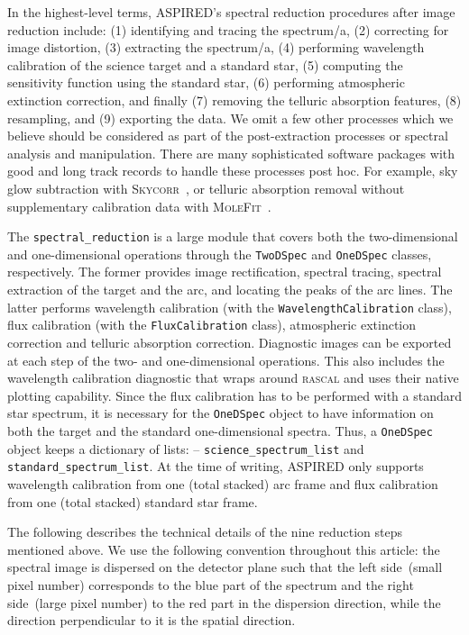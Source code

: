 \documentclass[linenumbers, twocolumn]{aastex631}
\begin{document}
In the highest-level terms, \textsc{ASPIRED}'s spectral reduction procedures
after image reduction include: (1) identifying and tracing the spectrum/a,
(2) correcting for image distortion, (3) extracting the spectrum/a,
(4) performing wavelength calibration of the science target and a standard
star, (5) computing the sensitivity function using the standard star,
(6) performing atmospheric extinction correction, and finally (7) removing
the telluric absorption features, (8) resampling, and (9) exporting the data.
We omit a few other processes which we believe should be considered as part of
the post-extraction processes or spectral analysis and manipulation. There are
many sophisticated  software packages with good and long track records to
handle these processes post hoc. For example, sky glow subtraction with
\textsc{Skycorr}~\citep{2014A&A...567A..25N}, or telluric
absorption removal without supplementary calibration data with
\textsc{MoleFit}~\citep{2015A&A...576A..77S, 2015A&A...576A..78K}.

The \texttt{spectral\_reduction} is a large module that covers both the
two-dimensional and one-dimensional operations through the \texttt{TwoDSpec} and
\texttt{OneDSpec} classes, respectively. The former provides image
rectification, spectral tracing, spectral extraction of the target and the
arc, and locating the peaks of the arc lines. The latter performs
wavelength calibration (with the \texttt{WavelengthCalibration} class),
flux calibration (with the \texttt{FluxCalibration} class), atmospheric
extinction correction and telluric absorption correction. Diagnostic images
can be exported at each step of the two- and one-dimensional operations.
This also includes the wavelength calibration diagnostic that wraps around
\textsc{rascal} and uses their native plotting capability.
Since the flux calibration has to be performed
with a standard star spectrum, it is necessary for the \texttt{OneDSpec}
object to have information on both the target and the standard one-dimensional
spectra. Thus, a \texttt{OneDSpec} object keeps a dictionary of lists: --
\texttt{science\_spectrum\_list} and \texttt{standard\_spectrum\_list}. At the
time of writing, \textsc{ASPIRED} only supports wavelength calibration from one (total
stacked) arc frame and flux calibration from one (total stacked) standard star frame.

The following describes the technical details of the nine reduction steps mentioned above.
We use the following convention throughout this article: the spectral image is
dispersed on the detector plane such that the left side~(small pixel number)
corresponds to the blue part of the spectrum and the right side~(large pixel
number) to the red part in the dispersion direction, while the direction
perpendicular to it is the spatial direction.
\end{document}

